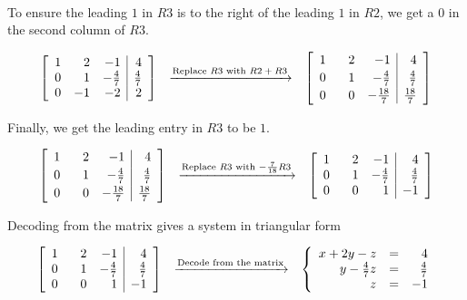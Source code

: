 \begin{ex}
\[\begin{array}{ccc}
\end{array}\]

To ensure the leading $1$ in $R3$ is to the right of the leading $1$ in $R2$, we get a $0$ in the second column of $R3$.

\[ \begin{array}{ccc}

\left[ \begin{array}{rrr|r} 
1 & 2 & -1 & 4 \\ 
0 & 1 & -\frac{4}{7} & \frac{4}{7} \\ 
0 & -1 & -2 & 2 \\ 
\end{array} \right]  
& 
\xrightarrow{\text{Replace $R3$ with $R2+R3$}} 
&  
\left[ \begin{array}{rrr|r} 
1 & \hphantom{-}2 & -1 & 4 \\ [2pt]
0 & 1 & -\frac{4}{7} & \frac{4}{7} \\ [2pt]
0 & 0 & -\frac{18}{7} & \frac{18}{7} \\ 
\end{array} \right]


\end{array}\]

Finally, we get the leading entry in $R3$ to be $1$.

\[\begin{array}{ccc}

\left[ \begin{array}{rrr|r} 
1 & \hphantom{-}2 & -1 & 4 \\ [2pt]
0 & 1 & -\frac{4}{7} & \frac{4}{7} \\ [2pt]
0 & 0 & -\frac{18}{7} & \frac{18}{7} \\ 
\end{array} \right]   
& 
\xrightarrow{\text{Replace $R3$ with $-\frac{7}{18}R3$}} 
& 
\left[ \begin{array}{rrr|r} 
1 & \hphantom{-}2 & -1 & 4 \\ 
0 & 1 & -\frac{4}{7} & \frac{4}{7} \\ 
0 & 0 &1 & -1 \\ 
\end{array} \right]

\end{array}\]

Decoding from the matrix gives a system in triangular form

\[ \begin{array}{ccc}

\left[ \begin{array}{rrr|r} 
1 & \hphantom{-}2 & -1 & 4 \\ 
0 & 1 & -\frac{4}{7} & \frac{4}{7} \\ 
0 & 0 &1 & -1 \\ 
\end{array} \right]  
& 
\xrightarrow{\text{Decode from the matrix}} 
& 
\left \{ \begin{array}{rcr} 
x + 2y-z & = & 4 \\ 
y - \frac{4}{7} z & = & \frac{4}{7} \\ 
z & = & -1 \end{array} \right.


\end{array}\]
\end{ex}
